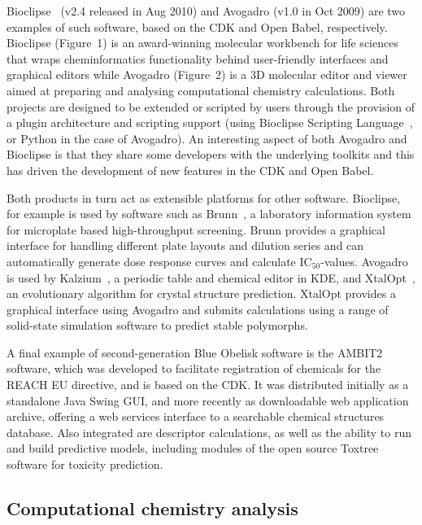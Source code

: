 \documentclass[10pt]{bmc_article}
\newenvironment{bmcformat}{\begin{raggedright}\baselineskip20pt\sloppy\setboolean{publ}{false}}{\end{raggedright}\baselineskip20pt\sloppy}
\begin{document}
\begin{bmcformat}
Bioclipse~\cite{Spjuth:2007fk} (v2.4 released in Aug 2010) and Avogadro
\cite{WebAvogadro} (v1.0 in Oct 2009) are two examples of such software, based
on the CDK and Open Babel, respectively. Bioclipse (Figure~1) is an award-winning
molecular workbench for life sciences
that wraps cheminformatics functionality behind user-friendly interfaces and
graphical editors while Avogadro (Figure~2) is a 3D molecular editor and viewer aimed at
preparing and analysing computational chemistry calculations. Both
projects are designed to be extended or scripted by users through
the provision of a plugin architecture and scripting support (using
Bioclipse Scripting Language~\cite{Bioclipse2}, or Python in the case
of Avogadro). An interesting aspect of both Avogadro and Bioclipse is
that they share some developers with the underlying toolkits and this
has driven the development of new features in the CDK and Open Babel.

Both products in turn act as extensible platforms for other
software. Bioclipse, for example is used by software
such as Brunn~\cite{Alvarsson:2011fk}, a laboratory information system for
microplate based high-throughput screening. Brunn provides a graphical interface
for handling different plate layouts and dilution series and can automatically
generate dose response curves and calculate IC$_{50}$-values. Avogadro
is used by Kalzium~\cite{WebKalzium}, a periodic table and chemical editor in KDE,
and XtalOpt~\cite{WebXtalOpt, Lonie2011}, an evolutionary
algorithm for crystal structure prediction. XtalOpt provides a
graphical interface using Avogadro and submits calculations using a
range of solid-state simulation software to predict stable polymorphs.

A final example of second-generation Blue Obelisk software is the 
AMBIT2~\cite{Jeliazkova2011,InSilicoTox_2010} software, which was developed to facilitate registration of chemicals for the REACH EU directive, and is based on the CDK. It was distributed initially as a standalone Java Swing GUI, and more recently as downloadable web application archive, offering a web services interface to a searchable chemical structures database. Also integrated are descriptor calculations, as well as the ability to run and build predictive models, including modules of the open source Toxtree~\cite{WebToxTree,InSilicoTox_2010,Toxtree} software for toxicity prediction.

\subsection*{Computational chemistry analysis}


\end{bmcformat}
\end{document}
